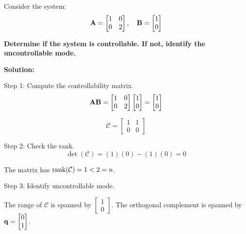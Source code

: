 \begin{examplebox}
\label{ex:uncontrollable}
Consider the system:
\begin{equation}
\mathbf{A} = \begin{bmatrix} 1 & 0 \\ 0 & 2 \end{bmatrix}, \quad
\mathbf{B} = \begin{bmatrix} 1 \\ 0 \end{bmatrix}
\end{equation}

\textbf{Determine if the system is controllable. If not, identify the uncontrollable mode.}

\textbf{Solution:}

Step 1: Compute the controllability matrix.
\begin{equation}
\mathbf{A}\mathbf{B} = \begin{bmatrix} 1 & 0 \\ 0 & 2 \end{bmatrix} \begin{bmatrix} 1 \\ 0 \end{bmatrix} = \begin{bmatrix} 1 \\ 0 \end{bmatrix}
\end{equation}

\begin{equation}
\mathcal{C} = \begin{bmatrix} 1 & 1 \\ 0 & 0 \end{bmatrix}
\end{equation}

Step 2: Check the rank.
\begin{equation}
\det(\mathcal{C}) = (1)(0) - (1)(0) = 0
\end{equation}

The matrix has $\operatorname{rank}(\mathcal{C}) = 1 < 2 = n$.

Step 3: Identify uncontrollable mode.

The range of $\mathcal{C}$ is spanned by $\begin{bmatrix} 1 \\ 0 \end{bmatrix}$. The orthogonal complement is spanned by $\mathbf{q} = \begin{bmatrix} 0 \\ 1 \end{bmatrix}$.


\end{examplebox}
